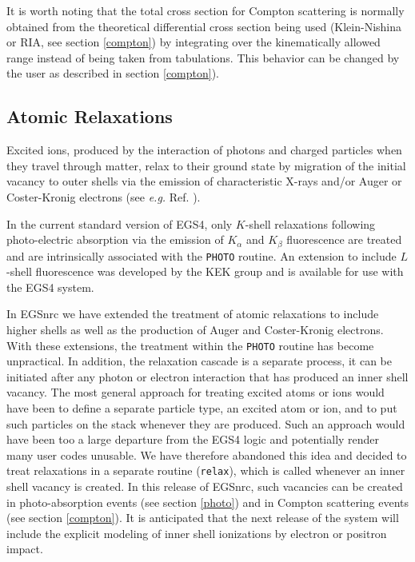 It is worth noting that the total cross section for Compton scattering is
normally obtained from the theoretical differential cross section being used
(Klein-Nishina or RIA, see section \ref{compton}) by
integrating over the kinematically allowed range instead of being taken from
tabulations. This behavior can be changed by the user as described in
section \ref{compton}).

\subsection{Atomic Relaxations}
\label{relax}

Excited ions, produced by the interaction of photons and
charged particles when they travel through matter, relax to
their ground state by migration of the initial vacancy to
outer shells via the emission of characteristic X-rays and/or
Auger or Coster-Kronig electrons (see {\em e.g.} Ref. \cite{Pe91}).

In the current standard version of EGS4, only $K$-shell relaxations following
photo-electric absorption via
the emission of $K_\alpha$ and $K_\beta$ fluorescence are treated
and are intrinsically associated with the {\tt PHOTO} routine.
An extension to include $L$-shell fluorescence was developed by the
KEK group \cite{Na98} and is available for use with the EGS4 system.

In EGSnrc we have extended the treatment of atomic relaxations
to include higher shells as well as the production of Auger and
Coster-Kronig electrons. With these extensions, the
treatment within the {\tt PHOTO} routine
has become unpractical. In addition, the relaxation cascade
is a separate process, it can be initiated after any photon
or electron interaction that has produced an inner shell vacancy.
The most general approach for treating excited atoms or ions would have
been to define a separate particle type, an excited atom or ion, and to
put such particles on the stack whenever they are produced.
Such an approach would have been too a large departure from
the EGS4 logic and potentially render many user codes unusable.
We have therefore abandoned this idea and decided to
treat relaxations in a separate routine ({\tt relax}),
which is called whenever an inner shell vacancy is created.
In this release of EGSnrc, such vacancies can be created in
photo-absorption events (see section \ref{photo}) and in
Compton scattering events (see section \ref{compton}).
It is anticipated that the next release of the system
will include the explicit modeling of inner shell
ionizations by electron or positron impact.

